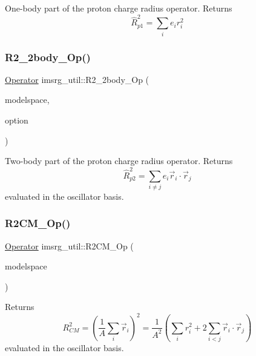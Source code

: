 One-\/body part of the proton charge radius operator. Returns \[ \hat{R}^{2}_{p1} = \sum_{i} e_{i}{r}_i^2 \] \mbox{\label{namespaceimsrg__util_a151e28afb63f6efabd79705c5e579b8d}} 
\subsubsection{\texorpdfstring{R2\+\_\+2body\+\_\+\+Op()}{R2\_2body\_Op()}}
{\footnotesize\ttfamily \hyperlink{classOperator}{Operator} imsrg\+\_\+util\+::\+R2\+\_\+2body\+\_\+\+Op (\begin{DoxyParamCaption}\item[{\hyperlink{classModelSpace}{Model\+Space} \&}]{modelspace,  }\item[{string}]{option }\end{DoxyParamCaption})}

Two-\/body part of the proton charge radius operator. Returns \[ \hat{R}^{2}_{p2} = \sum_{i\neq j} e_{i}\vec{r}_i\cdot\vec{r}_j \] evaluated in the oscillator basis. \mbox{\label{namespaceimsrg__util_a2d145f9a5e7bd930b22a6c951ea6c2e2}} 
\subsubsection{\texorpdfstring{R2\+C\+M\+\_\+\+Op()}{R2CM\_Op()}}
{\footnotesize\ttfamily \hyperlink{classOperator}{Operator} imsrg\+\_\+util\+::\+R2\+C\+M\+\_\+\+Op (\begin{DoxyParamCaption}\item[{\hyperlink{classModelSpace}{Model\+Space} \&}]{modelspace }\end{DoxyParamCaption})}

Returns \[ R^{2}_{CM} = \left( \frac{1}{A}\sum_{i}\vec{r}_{i}\right)^2 = \frac{1}{A^2} \left( \sum_{i}r_{i}^{2} + 2\sum_{i<j}\vec{r}_i\cdot\vec{r}_j \right) \] evaluated in the oscillator basis. \mbox{\label{namespaceimsrg__util_ae3faffcf58cb8213b3e41533a0cd87d3}} 
